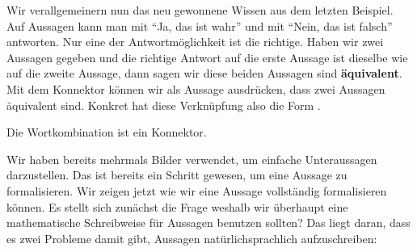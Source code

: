 \documentclass[../../main.tex]{subfiles}
\begin{document}
Wir verallgemeinern nun das neu gewonnene Wissen aus dem letzten Beispiel. Auf Aussagen kann man mit \enquote{Ja, das ist wahr} und mit \enquote{Nein, das ist falsch} antworten. Nur eine der Antwortmöglichkeit ist die richtige. Haben wir zwei Aussagen gegeben und die richtige Antwort auf die erste Aussage ist dieselbe wie auf die zweite Aussage, dann sagen wir diese beiden Aussagen sind \textbf{äquivalent}. Mit dem Konnektor  können wir als Aussage ausdrücken, dass zwei Aussagen äquivalent sind. Konkret hat diese Verknüpfung also die Form .

\begin{lemma}
    Die Wortkombination  ist ein Konnektor.
\end{lemma}

Wir haben bereits mehrmals Bilder verwendet, um einfache Unteraussagen darzustellen. Das ist bereits ein Schritt gewesen, um eine Aussage zu formalisieren. Wir zeigen jetzt wie wir eine Aussage vollständig formalisieren können. Es stellt sich zunächst die Frage weshalb wir überhaupt eine mathematische Schreibweise für Aussagen benutzen sollten? Das liegt daran, dass es zwei Probleme damit gibt, Aussagen natürlichsprachlich aufzuschreiben:
\end{document}

